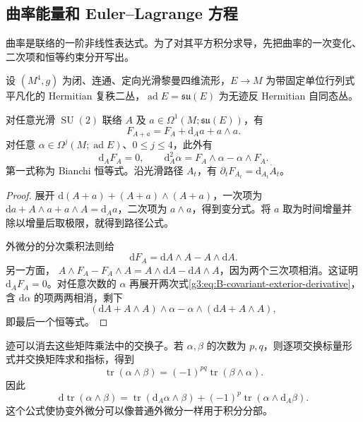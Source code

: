 \subsection{曲率能量和 Euler–Lagrange 方程}
\label{g3:subsec:B01:02}

曲率是联络的一阶非线性表达式。为了对其平方积分求导，先把曲率的一次变化、二次项和恒等约束分开写出。

\begin{lemma}\label{g3:lem:B-curvature-variation-bianchi}
	设 \((M^4,g)\) 为闭、连通、定向光滑黎曼四维流形，\(E\to M\) 为带固定单位行列式平凡化的 Hermitian 复秩二丛，\(\operatorname{ad}E=\mathfrak{su}(E)\) 为无迹反 Hermitian 自同态丛。

	对任意光滑 \(\operatorname{SU}(2)\) 联络 \(A\) 及
	\(a\in\Omega^1(M;\mathfrak{su}(E))\)，有
	\begin{equation}\label{g3:eq:B-curvature-variation}
		F_{A+a}=F_A+\mathrm d_Aa+a\wedge a.
	\end{equation}
	对任意 \(\alpha\in\Omega^j(M;\operatorname{ad}E)\)、\(0\le j\le4\)，此外有
	\[
		\mathrm d_AF_A=0,\qquad
		\mathrm d_A^2\alpha=F_A\wedge\alpha-\alpha\wedge F_A.
	\]
	第一式称为 Bianchi 恒等式。沿光滑路径 \(A_t\)，有
	\(\partial_tF_{A_t}=\mathrm d_{A_t}\dot A_t\)。
\end{lemma}
\begin{proof}
	展开
	\(\mathrm d(A+a)+(A+a)\wedge(A+a)\)，一次项为
	\(\mathrm da+A\wedge a+a\wedge A=\mathrm d_Aa\)，二次项为 \(a\wedge a\)，得到变分式。将 \(a\) 取为时间增量并除以增量后取极限，就得到路径公式。

	外微分的分次乘积法则给
	\[
		\mathrm dF_A=\mathrm dA\wedge A-A\wedge\mathrm dA.
	\]
	另一方面，
	\(A\wedge F_A-F_A\wedge A=A\wedge\mathrm dA-\mathrm dA\wedge A\)，因为两个三次项相消。这证明 \(\mathrm d_AF_A=0\)。对任意次数的 \(\alpha\) 再展开两次式\eqref{g3:eq:B-covariant-exterior-derivative}，含 \(\mathrm d\alpha\) 的项两两相消，剩下
	\[
		(\mathrm dA+A\wedge A)\wedge\alpha
		-\alpha\wedge(\mathrm dA+A\wedge A),
	\]
	即最后一个恒等式。
\end{proof}

迹可以消去这些矩阵乘法中的交换子。若 \(\alpha,\beta\) 的次数为 \(p,q\)，则逐项交换标量形式并交换矩阵求和指标，得到
\[
	\operatorname{tr}(\alpha\wedge\beta)
	=(-1)^{pq}\operatorname{tr}(\beta\wedge\alpha).
\]
因此
\begin{equation}\label{g3:eq:B-trace-leibniz}
	\mathrm d\operatorname{tr}(\alpha\wedge\beta)
	=\operatorname{tr}(\mathrm d_A\alpha\wedge\beta)
	  +(-1)^p\operatorname{tr}(\alpha\wedge\mathrm d_A\beta).
\end{equation}
这个公式使协变外微分可以像普通外微分一样用于积分分部。

